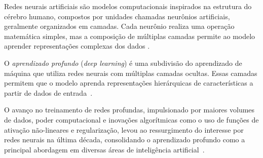 \documentclass[12pt]{article}
\begin{document}
Redes neurais artificiais são modelos computacionais inspirados na estrutura do cérebro humano, compostos por unidades chamadas neurônios artificiais, geralmente organizados em camadas. Cada neurônio realiza uma operação matemática simples, mas a composição de múltiplas camadas permite ao modelo aprender representações complexas dos dados \cite{goodfellow2016}.

O \textit{aprendizado profundo} (\textit{deep learning}) é uma subdivisão do aprendizado de máquina que utiliza redes neurais com múltiplas camadas ocultas. Essas camadas permitem que o modelo aprenda representações hierárquicas de características a partir de dados de entrada~\cite{goodfellow2016}.

O avanço no treinamento de redes profundas, impulsionado por maiores volumes de dados, poder computacional e inovações algorítmicas como o uso de funções de ativação não-lineares e regularização, levou ao ressurgimento do interesse por redes neurais na última década, consolidando o aprendizado profundo como a principal abordagem em diversas áreas de inteligência artificial~\cite{goodfellow2016}.
\end{document}
